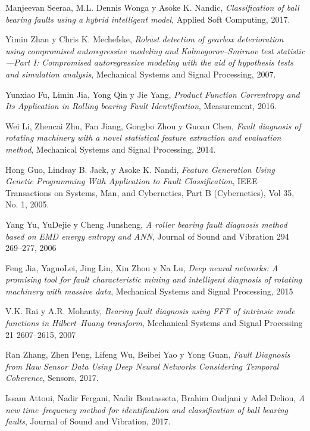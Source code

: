 \documentclass[12pt]{article}%
\begin{document}
\clearpage

\begin{thebibliography}{9}
Manjeevan Seeraa, M.L. Dennis Wonga y Asoke K. Nandic, \textit{Classification of ball bearing faults using a hybrid intelligent model}, Applied Soft Computing, 2017.

Yimin Zhan y Chris K. Mechefske, \textit{Robust detection of gearbox deterioration using compromised
autoregressive modeling and Kolmogorov–Smirnov test statistic—Part I: Compromised autoregressive modeling with the
aid of hypothesis tests and simulation analysis}, Mechanical Systems and Signal Processing, 2007.

Yunxiao Fu, Limin Jia, Yong Qin y Jie Yang, \textit{Product Function Correntropy and Its Application in Rolling bearing Fault Identification}, Measurement, 2016.

Wei Li, Zhencai Zhu, Fan Jiang, Gongbo Zhou y Guoan Chen, \textit{Fault diagnosis of rotating machinery with a novel statistical feature extraction and evaluation method}, Mechanical Systems and Signal Processing, 2014.

Hong Guo, Lindsay B. Jack, y Asoke K. Nandi, \textit{Feature Generation Using Genetic Programming With Application to Fault Classification}, IEEE Transactions on Systems, Man, and Cybernetics, Part B (Cybernetics), Vol 35, No. 1, 2005.

Yang Yu, YuDejie y Cheng Junsheng, \textit{A roller bearing fault diagnosis method based
on EMD energy entropy and ANN}, Journal of Sound and Vibration 294 269–277, 2006 

Feng Jia, YaguoLei, Jing Lin, Xin Zhou y Na Lu, \textit{Deep neural networks: A promising tool for fault characteristic mining and intelligent diagnosis of rotating machinery with massive data}, Mechanical Systems and Signal Processing, 2015

V.K. Rai y A.R. Mohanty, \textit{Bearing fault diagnosis using FFT of intrinsic mode functions in Hilbert–Huang transform}, Mechanical Systems and Signal Processing 21 2607–2615, 2007

Ran Zhang, Zhen Peng, Lifeng Wu, Beibei Yao y Yong Guan, \textit{Fault Diagnosis from Raw Sensor Data Using Deep Neural Networks Considering Temporal Coherence}, Sensors, 2017.

Issam Attoui, Nadir Fergani, Nadir Boutasseta, Brahim Oudjani y Adel Deliou, \textit{A new time–frequency method for identification and classification of ball bearing faults}, Journal of Sound and Vibration, 2017.


\end{thebibliography}
\end{document}
